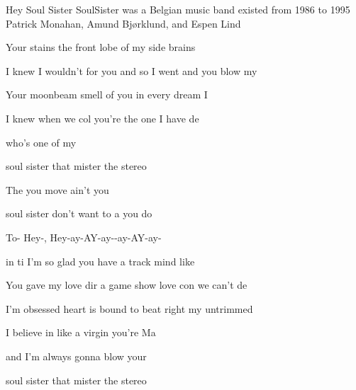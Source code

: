 \begin{SBSong}{Hey Soul Sister}
  {SoulSister was a Belgian music band existed from 1986 to 1995}
  {Patrick Monahan, Amund Bj\o rklund, and Espen Lind}
  \begin{SBVerse}
    Your  stains  the front lobe of my  side brains 

    I knew I wouldn't for you and so I went and  you blow my   

    Your  moonbeam  smell of you in every  dream I 

    I knew when we col you're the one I have de 

    who's one of my   
  \end{SBVerse}
  \begin{SBChorus}
     soul sister  that mister   the  stereo

    The  you move ain't  you 

     soul sister  don't want to  a   you do  

    To- Hey-, Hey-ay-AY-ay--ay-AY-ay-
  \end{SBChorus}
  \begin{SBVerse}
     in ti I'm so glad you have a  track mind like 
    
    You gave my love dir a game show love con we can't de  
    
    I'm  obsessed  heart is bound to beat right  my untrimmed 
    
    I believe in  like a virgin you're Ma 

    and I'm always gonna  blow your  
  \end{SBVerse}
  \begin{SBChorus}
     soul sister  that mister   the  stereo
    

\end{SBChorus}
\end{SBSong}
